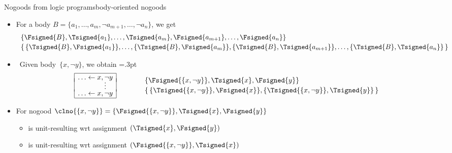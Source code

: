 \begin{frame}{Nogoods from logic programs}{body-oriented nogoods}
  \begin{itemize}
  \item <1-> For a body $B=\{a_1,\dots,a_m,\neg a_{m+1},\dots,\neg a_n\}$, %
    we get
    \vspace{-2pt}
    \[
    \begin{array}{l}
      \{\Fsigned{B},\Tsigned{a_1},\dots,\Tsigned{a_m},\Fsigned{a_{m+1}},\dots,\Fsigned{a_n}\}
      \\[2pt]
      \{\,
      \{\Tsigned{B},\Fsigned{a_1}\},
      \dots,
      \{\Tsigned{B},\Fsigned{a_m}\},
      \{\Tsigned{B},\Tsigned{a_{m+1}}\},
      \dots,
      \{\Tsigned{B},\Tsigned{a_n}\}
      \,\}
    \end{array}
  \]
  \item<2->  \
    Given body~$\{x,\neg y\}$, we obtain
    \arrayrulewidth=.3pt
    \[
      \begin{array}{@{}|r@{}l|}
        \hline
        \ldots\leftarrow{}&x,\neg y\\[-1.2ex]
                          &\quad\vdots\\[-3pt]
        \ldots\leftarrow{}&x,\neg y\\
        \hline
      \end{array}
      \quad\quad
      \begin{array}{p{5pt}l}
        &\{\Fsigned{\{x,\neg y\}},\Tsigned{x},\Fsigned{y}\}
        \\[2pt]
        &\{\,\{\Tsigned{\{x,\neg y\}},\Fsigned{x}\},\{\Tsigned{\{x,\neg y\}},\Tsigned{y}\}\,\}
      \end{array}
    \]
  \item<3-> []
    For nogood $\clno{\{x,\neg y\}}=\{\Fsigned{\{x,\neg y\}},\Tsigned{x},\Fsigned{y}\}$
    \begin{itemize}\normalsize
    \item {} is unit-resulting  wrt assignment $(\Tsigned{x},\Fsigned{y})$
      \smallskip
    \item {}            is unit-resulting  wrt assignment $(\Fsigned{\{x,\neg y\}},\Tsigned{x})$
    \end{itemize}
  \end{itemize}
\end{frame}
